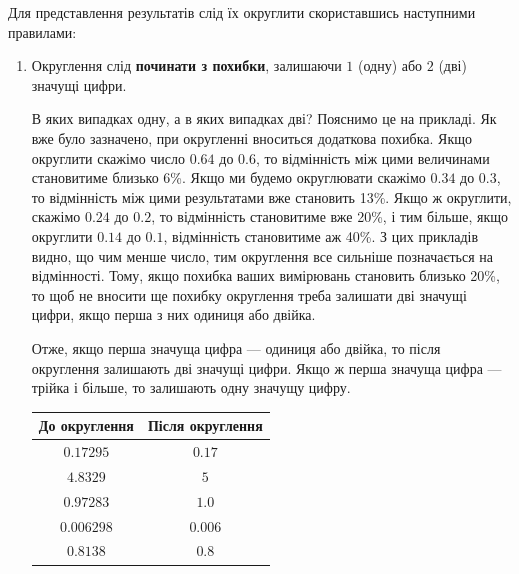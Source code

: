 \documentclass{LabBook}
\begin{document}
  Для представлення результатів слід їх округлити скориставшись наступними правилами:
  \begin{enumerate}
    \item Округлення слід \textbf{починати з похибки}, залишаючи $1$ (одну) або $2$ (дві) значущі цифри.

          \begin{Warning}
            В яких випадках одну, а в яких випадках дві? Пояснимо це на прикладі. Як вже було зазначено, при округленні вноситься додаткова похибка. Якщо округлити скажімо число $0.64$ до $0.6$, то відмінність між цими величинами становитиме близько 6\%. Якщо ми будемо округлювати скажімо $0.34$ до $0.3$, то відмінність між цими результатами вже становить 13\%. Якщо ж округлити, скажімо $0.24$ до $0.2$, то відмінність становитиме вже 20\%, і тим більше, якщо округлити $0.14$ до $0.1$, відмінність становитиме аж 40\%. З цих прикладів видно, що чим менше число, тим округлення все сильніше позначається на відмінності. Тому, якщо похибка ваших вимірювань становить близько 20\%, то щоб не вносити ще похибку округлення треба залишати дві значущі цифри, якщо перша з них одиниця або двійка.
          \end{Warning}

          Отже, якщо перша значуща цифра --- одиниця або двійка, то після округлення залишають дві значущі цифри. Якщо ж перша значуща цифра --- трійка і більше, то залишають одну значущу цифру.
          \begin{center}
            \begin{tabular}{cc}
              \toprule
              До округлення & Після округлення \\ \midrule
              $0.17295$     & $0.17$           \\
              $4.8329$      & $5$              \\
              $0.97283$     & $1.0$            \\
              $0.006298$    & $0.006$          \\
              $0.8138$      & $0.8$            \\ \bottomrule
            \end{tabular}
          \end{center}


\end{enumerate}
\end{document}
